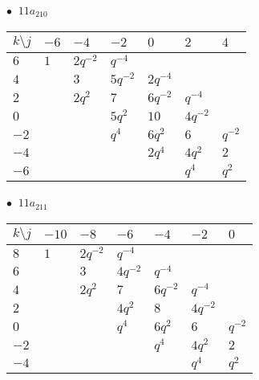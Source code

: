 \begin{minipage}{\linewidth}
$\bullet\ $ $11a_{210}$ \vspace{0.5em} \\
\begin{tabular}{l|llllll}
$k \setminus j$ & $-6$ & $-4$ & $-2$ & $0$ & $2$ & $4$ \\
\hline
$6$ & $1$ & $2q^{-2}$ & $q^{-4}$ &  &  &  \\
$4$ &  & $3$ & $5q^{-2}$ & $2q^{-4}$ &  &  \\
$2$ &  & $2q^{2}$ & $7$ & $6q^{-2}$ & $q^{-4}$ &  \\
$0$ &  &  & $5q^{2}$ & $10$ & $4q^{-2}$ &  \\
$-2$ &  &  & $q^{4}$ & $6q^{2}$ & $6$ & $q^{-2}$ \\
$-4$ &  &  &  & $2q^{4}$ & $4q^{2}$ & $2$ \\
$-6$ &  &  &  &  & $q^{4}$ & $q^{2}$ \\
\end{tabular}
\vspace{2em}
\end{minipage}
%
\begin{minipage}{\linewidth}
$\bullet\ $ $11a_{211}$ \vspace{0.5em} \\
\begin{tabular}{l|llllll}
$k \setminus j$ & $-10$ & $-8$ & $-6$ & $-4$ & $-2$ & $0$ \\
\hline
$8$ & $1$ & $2q^{-2}$ & $q^{-4}$ &  &  &  \\
$6$ &  & $3$ & $4q^{-2}$ & $q^{-4}$ &  &  \\
$4$ &  & $2q^{2}$ & $7$ & $6q^{-2}$ & $q^{-4}$ &  \\
$2$ &  &  & $4q^{2}$ & $8$ & $4q^{-2}$ &  \\
$0$ &  &  & $q^{4}$ & $6q^{2}$ & $6$ & $q^{-2}$ \\
$-2$ &  &  &  & $q^{4}$ & $4q^{2}$ & $2$ \\
$-4$ &  &  &  &  & $q^{4}$ & $q^{2}$ \\
\end{tabular}
\vspace{2em}
\end{minipage}
%
